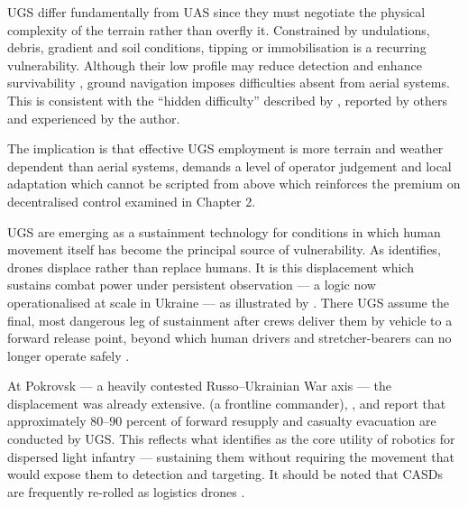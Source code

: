 {%

UGS differ fundamentally from UAS since they must negotiate the physical complexity of the terrain rather than overfly it. Constrained by undulations, debris, gradient and soil conditions, tipping or immobilisation is a recurring vulnerability. Although their low profile may reduce detection and enhance survivability \parencite{david_participant_2}, ground navigation imposes difficulties absent from aerial systems. This is consistent with the ``hidden difficulty'' described by \textcite{Rivero_2026_0_03}, reported by others \parencite{manley_2024_04_06_ground_drone_trench_attack} and experienced by the author.

The implication is that effective UGS employment is more terrain and weather dependent than aerial systems, demands a level of operator judgement and local adaptation which cannot be scripted from above which reinforces the premium on decentralised control examined in Chapter 2.


UGS are emerging as a sustainment technology for conditions in which human movement itself has become the principal source of vulnerability. As \textcite[33]{MOLLOY_2024} identifies, drones displace rather than replace humans. It is this displacement which sustains combat power under persistent observation --- a logic now operationalised at scale in Ukraine --- as illustrated by \textcite{mod_russia_20260315_UGS}. There UGS assume the final, most dangerous leg of sustainment after crews deliver them by vehicle to a forward release point, beyond which human drivers and stretcher-bearers can no longer operate safely \parencite{david_participant_2}.

At Pokrovsk --- a heavily contested Russo--Ukrainian War axis --- the displacement was already extensive. \textcite{Shatalov_2025} (a frontline commander), \textcite{third_army_corps_2025_10_23}, \parencite{david_participant_2} and \textcite{Rivero_2026_0_03} report that approximately $80$--$90$ percent of forward resupply and casualty evacuation are conducted by UGS. This reflects what \textcite[57]{Watling_book} identifies as the core utility of robotics for dispersed light infantry --- sustaining them without requiring the movement that would expose them to detection and targeting. It should be noted that CASDs are frequently re-rolled as logistics drones \parencite[18]{watling_2025_10}.


}
